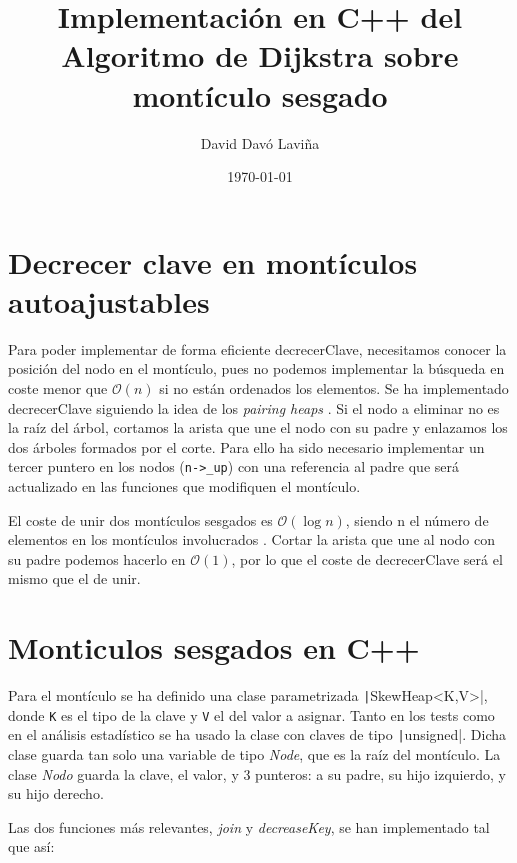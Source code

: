 \documentclass{article}
\title{Implementación en C++ del Algoritmo de Dijkstra sobre montículo sesgado}
\author{David Davó Laviña}
\date{\today{}}
\begin{document}
\section{Decrecer clave en montículos autoajustables}
Para poder implementar de forma eficiente decrecerClave, necesitamos conocer la
posición del nodo en el montículo, pues no podemos implementar la búsqueda en coste
menor que $\mathcal{O}(n)$ si no están ordenados los elementos. Se ha implementado
decrecerClave siguiendo la idea de los \textit{pairing heaps} \cite{PairingHeap}. Si el nodo
a eliminar no es la raíz del árbol, cortamos la arista que une el nodo con su padre y
enlazamos los dos árboles formados por el corte. Para ello ha sido necesario
implementar un tercer puntero en los nodos (\texttt{n->\_up}) con una referencia al padre
que será actualizado en las funciones que modifiquen el montículo.

El coste de unir dos montículos sesgados es $\mathcal{O}(\log n)$, siendo n el número de elementos en los montículos involucrados \cite{SkewHeap}. Cortar la arista que une al nodo con su padre podemos hacerlo en $\mathcal{O}(1)$, por lo que el coste de decrecerClave será el mismo que el de unir. 

\section{Monticulos sesgados en C++}
Para el montículo se ha definido una clase parametrizada \texttt|SkewHeap<K,V>|, donde \texttt{K} es el tipo de la clave y \texttt{V} el del valor a asignar. Tanto en los tests como en el análisis estadístico se ha usado la clase con claves de tipo \texttt|unsigned|. Dicha clase guarda tan solo una variable de tipo \textit{Node}, que es la raíz del montículo. La clase \textit{Nodo} guarda la clave, el valor, y 3 punteros: a su padre, su hijo izquierdo, y su hijo derecho.

Las dos funciones más relevantes, \textit{join} y \textit{decreaseKey}, se han implementado tal que así:
\end{document}
